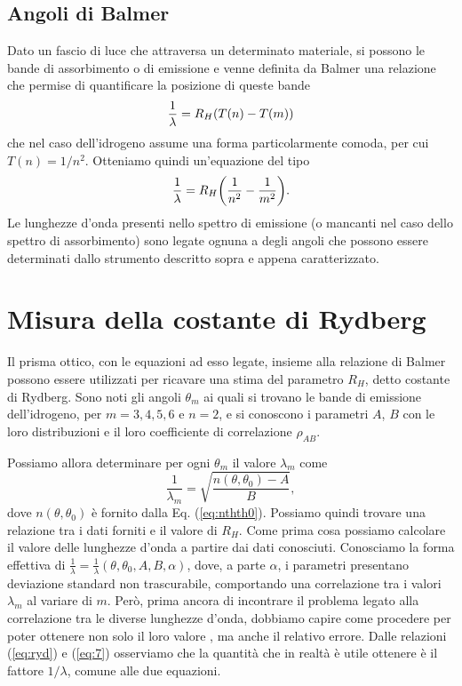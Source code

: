 \documentclass[a4paper,aps,12pt,tightenlines]{revtex4-2}
\begin{document}
\subsection{Angoli di Balmer}

Dato un fascio di luce che attraversa un determinato materiale, si possono le bande di assorbimento o di emissione e venne definita da Balmer una relazione che permise di quantificare la posizione di queste bande \begin{equation} \frac{1}{\lambda} = R_H \qty(T(n) - T(m)) \end{equation} che nel caso dell'idrogeno assume una forma particolarmente comoda, per cui $T(n) = 1/n^2$. Otteniamo quindi un'equazione del tipo \begin{equation} \frac{1}{\lambda} = R_H \qty(\frac{1}{n^2} - \frac{1}{m^2}). \label{eq:ryd}\end{equation} Le lunghezze d'onda presenti nello spettro di emissione (o mancanti nel caso dello spettro di assorbimento) sono legate ognuna a degli angoli che possono essere determinati dallo strumento descritto sopra e appena caratterizzato. 

\section{Misura della costante di Rydberg}

Il prisma ottico, con le equazioni ad esso legate, insieme alla relazione di Balmer possono essere utilizzati per ricavare una stima del parametro $R_H$, detto costante di Rydberg. Sono noti gli angoli $\theta_m$ ai quali si trovano le bande di emissione dell'idrogeno, per $m = 3, 4, 5, 6$ e $n=2$, e si conoscono i parametri $A$, $B$ con le loro distribuzioni e il loro coefficiente di correlazione $\rho_{AB}$.

Possiamo allora determinare per ogni $\theta_m$ il valore $\lambda_m$ come \begin{equation} \frac{1}{\lambda_m} =  \sqrt{\frac{n(\theta, \theta_0) - A}{B}}, \label{eq:7}\end{equation} dove $n(\theta, \theta_0)$ è fornito dalla Eq. (\ref{eq:nthth0}). 
Possiamo quindi trovare una relazione tra i dati forniti e il valore di $R_H$. 
Come prima cosa possiamo calcolare il valore delle lunghezze d'onda a partire dai dati conosciuti. Conosciamo la forma effettiva di $\frac{1}{\lambda} = \frac{1}{\lambda}(\theta, \theta_0, A, B, \alpha)$, dove, a parte $\alpha$, i parametri presentano deviazione standard non trascurabile, comportando una correlazione tra i valori $\lambda_m$ al variare di $m$. Però, prima ancora di incontrare il problema legato alla correlazione tra le diverse lunghezze d'onda, dobbiamo capire come procedere per poter ottenere non solo il loro valore , ma anche il relativo errore. Dalle relazioni (\ref{eq:ryd}) e (\ref{eq:7}) osserviamo che la quantità che in realtà è utile ottenere è il fattore $1/\lambda$, comune alle due equazioni. 
\end{document}
